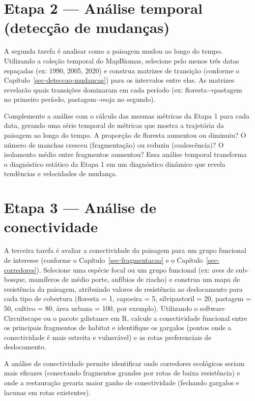 \documentclass[
  portuguese,
  11pt,
  a4paper,
  open=any]{scrbook}
\begin{document}
\section{Etapa 2 --- Análise temporal (detecção de
mudanças)}\label{etapa-2-anuxe1lise-temporal-detecuxe7uxe3o-de-mudanuxe7as}

A segunda tarefa é analisar como a paisagem mudou ao longo do tempo.
Utilizando a coleção temporal do MapBiomas, selecione pelo menos três
datas espaçadas (ex: 1990, 2005, 2020) e construa matrizes de transição
(conforme o Capítulo~\ref{sec-deteccao-mudancas}) para os intervalos
entre elas. As matrizes revelarão quais transições dominaram em cada
período (ex: floresta→pastagem no primeiro período, pastagem→soja no
segundo).

Complemente a análise com o cálculo das mesmas métricas da Etapa 1 para
cada data, gerando uma série temporal de métricas que mostra a
trajetória da paisagem ao longo do tempo. A proporção de floresta
aumentou ou diminuiu? O número de manchas cresceu (fragmentação) ou
reduziu (coalescência)? O isolamento médio entre fragmentos aumentou?
Essa análise temporal transforma o diagnóstico estático da Etapa 1 em um
diagnóstico dinâmico que revela tendências e velocidades de mudança.

\section{Etapa 3 --- Análise de
conectividade}\label{etapa-3-anuxe1lise-de-conectividade}

A terceira tarefa é avaliar a conectividade da paisagem para um grupo
funcional de interesse (conforme o Capítulo~\ref{sec-fragmentacao} e o
Capítulo~\ref{sec-corredores}). Selecione uma espécie focal ou um grupo
funcional (ex: aves de sub-bosque, mamíferos de médio porte, anfíbios de
riacho) e construa um mapa de resistência da paisagem, atribuindo
valores de resistência ao deslocamento para cada tipo de cobertura
(floresta = 1, capoeira = 5, silvipastoril = 20, pastagem = 50, cultivo
= 80, área urbana = 100, por exemplo). Utilizando o software
Circuitscape ou o pacote gdistance em R, calcule a conectividade
funcional entre os principais fragmentos de habitat e identifique os
gargalos (pontos onde a conectividade é mais estreita e vulnerável) e as
rotas preferenciais de deslocamento.

A análise de conectividade permite identificar onde corredores
ecológicos seriam mais eficazes (conectando fragmentos grandes por rotas
de baixa resistência) e onde a restauração geraria maior ganho de
conectividade (fechando gargalos e lacunas em rotas existentes).
\end{document}
